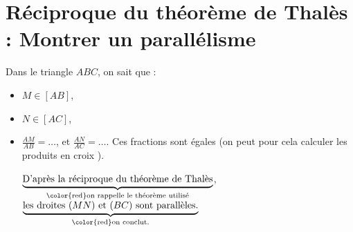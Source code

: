 \documentclass[14 pt, twoside]{extarticle}
\theoremstyle{plain}
\begin{document}
	\section{Réciproque du théorème de Thalès : Montrer un parallélisme}
	
	
	Dans le triangle $ABC$, on sait que : 

\begin{itemize}
\item $M\in [AB]$, 
\item $N\in [AC]$, 
\item $\displaystyle \frac{AM}{AB} = \ldots$, et  $ \frac{AN}{AC} = \ldots$. 
Ces fractions sont égales ({\color{red}on peut pour cela calculer les produits en croix} ).

$\underbrace{\text{D'après la réciproque du théorème de Thalès}}_{\text{\color{red}on rappelle le théorème utilisé}}$,\\
 $\underbrace{\text{les droites $(MN)$ et $(BC)$ sont parallèles.}}_{\text{\color{red}on conclut}.}$ 

\end{itemize}
	
 	
\end{document}
